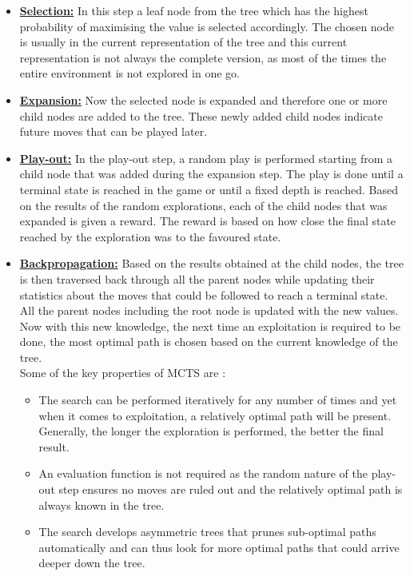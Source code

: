 \documentclass{svproc}
\begin{document}
    \begin{itemize}

        \item \textbf{\underline{Selection:}} In this step a leaf node from the tree which has the highest probability of maximising the value is selected accordingly. The chosen node is usually in the current representation of the tree and this current representation is not always the complete version, as most of the times the entire environment is not explored in one go.
        \newline
        \item \textbf{\underline{Expansion:}} Now the selected node is expanded and therefore one or more child nodes are added to the tree. These newly added child nodes indicate future moves that can be played later.
        \newline
        \item \textbf{\underline{Play-out:}} In the play-out step, a random play is performed starting from a child node that was 	added during the expansion step. The play is done until a terminal state is reached in the game or until a fixed depth is reached. Based on the results of the random explorations, each of the child nodes that was expanded is given a reward. The reward is based on how close the final state reached by the exploration was to the favoured state.
        \newline
        \item \textbf{\underline{Backpropagation:}} Based on the results obtained at the child nodes, the tree is then traversed back through all the parent nodes while updating their statistics about the moves that could be followed to reach a terminal state. All the parent nodes including the root node is updated with the new values. Now with this new knowledge, the next time an exploitation is required to be done, the most optimal path is chosen based on the current knowledge of the tree. \\

        Some of the key properties of MCTS are \cite{mcts_keyProps}:\\

        \begin{itemize}

            \item The search can be performed iteratively for any number of times and yet when it comes to exploitation, a relatively optimal path will be present. Generally, the longer the exploration is performed, the better the final result.

            \item An evaluation function is not required as the random nature of the play-out step ensures no moves are ruled out and the relatively optimal path is always known in the tree.

            \item The search develops asymmetric trees that prunes sub-optimal paths automatically and can thus look for more optimal paths that could arrive deeper down the tree.

        \end{itemize}

    \end{itemize}
\end{document}
